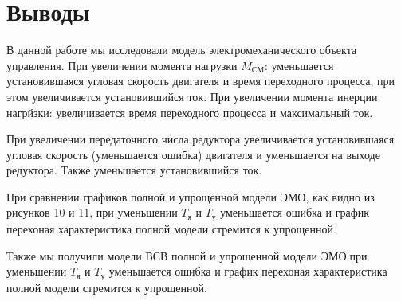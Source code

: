 \documentclass[a4paper, 12pt]{article}
\begin{document}
\newpage
\section*{\centering Выводы}
В данной работе мы исследовали модель электромеханического объекта управления. При увеличении момента нагрузки $M_\text{СМ}$: уменьшается установившаяся угловая скорость двигателя и время переходного процесса, при этом увеличивается установившийся ток. При увеличении момента инерции нагрйзки: увеличивается время переходного процесса и максимальный ток. \par
При увеличении передаточного числа редуктора увеличивается установившаяся угловая скорость (уменьшается ошибка) двигателя и уменьшается на выходе редуктора. Также уменьшается установившийся ток. \par
При сравнении графиков полной и упрощенной модели ЭМО, как видно из рисунков 10 и 11, при уменьшении $T_\text{я}$ и $T_\text{у}$ уменьшается ошибка и график перехоная характеристика полной модели стремится к упрощенной. \par
Также мы получили модели ВСВ полной и упрощенной модели ЭМО.при уменьшении $T_\text{я}$ и $T_\text{у}$ уменьшается ошибка и график перехоная характеристика полной модели стремится к упрощенной. \par
\end{document}
